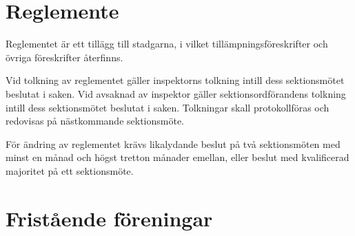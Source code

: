 \documentclass[stadgar]{dsekprotokoll}
\begin{document}
\section{Reglemente}

\begin{stadgeavsnitt}


Reglementet är ett tillägg till stadgarna, i vilket
tillämpningsföreskrifter och övriga föreskrifter återfinns.


Vid tolkning av reglementet gäller inspektorns tolkning intill dess
sektionsmötet beslutat i saken. Vid avsaknad av inspektor gäller
sektionsordförandens tolkning intill dess sektionsmötet beslutat i saken.
Tolkningar skall protokollföras och redovisas på nästkommande
sektionsmöte.


För ändring av reglementet krävs likalydande beslut på två sektionsmöten
med minst en månad och högst tretton månader emellan, eller beslut med
kvalificerad majoritet på ett sektionsmöte.

\end{stadgeavsnitt}

\section{Fristående föreningar}
\end{document}
